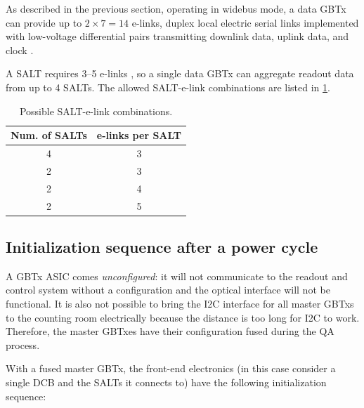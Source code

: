 As described in the previous section,
operating in widebus mode,
a data GBTx can provide up to $2 \times 7 = 14$ e-links,
duplex local electric serial links implemented with low-voltage differential
pairs transmitting downlink data, uplink data, and clock
\cite{gbtx_manual}.

A SALT requires 3--5 e-links \cite{s22010107},
so a single data GBTx can aggregate readout data from up to 4 SALTs.
The allowed SALT-e-link combinations are listed in \cref{tab:salt-elink}.

\begin{table}[!htb]
    \centering
    \begin{tabular}{ c | c }
        \toprule
        \textbf{Num. of SALTs} & \textbf{e-links per SALT} \\
        \midrule
        4  &  3  \\
        2  &  3  \\
        2  &  4  \\
        2  &  5  \\
        \bottomrule
    \end{tabular}

    \caption{Possible SALT-e-link combinations.}
    \label{tab:salt-elink}
\end{table}


\subsection{Initialization sequence after a power cycle}
\label{dcb-init}

A GBTx ASIC comes \emph{unconfigured}:
it will not communicate to the readout and control system without a
configuration and the optical interface will not be functional.
It is also not possible to bring the I2C interface for all master GBTxs
to the counting room electrically because the distance is too long for I2C to
work.
Therefore, the master GBTxes have their configuration fused during the QA
process.

With a fused master GBTx, the front-end electronics
(in this case consider a single DCB and the SALTs it connects to) have the
following initialization sequence:

